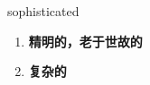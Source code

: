
\begin{frame}
{\huge sophisticated}
\begin{center}
\begin{enumerate}\Large
  \item \textbf{精明的，老于世故的}
  \item \textbf{复杂的}
\end{enumerate}
\end{center}
\end{frame}

